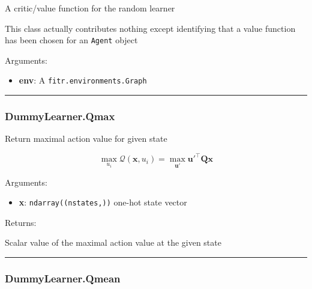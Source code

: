 A critic/value function for the random learner

This class actually contributes nothing except identifying that a value
function has been chosen for an \texttt{Agent} object

Arguments:

\begin{itemize}
\tightlist
\item
  \textbf{env}: A \texttt{fitr.environments.Graph}
\end{itemize}

\begin{center}\rule{0.5\linewidth}{\linethickness}\end{center}

\hypertarget{dummylearner.qmax}{%
\subsubsection{DummyLearner.Qmax}\label{dummylearner.qmax}}

\begin{Shaded}
\begin{Highlighting}[]
\end{Highlighting}
\end{Shaded}

Return maximal action value for given state

\[
\max_{u_i}\mathcal Q(\mathbf x, u_i) = \max_{\mathbf u'} \mathbf u'^\top \mathbf Q \mathbf x
\]

Arguments:

\begin{itemize}
\tightlist
\item
  \textbf{x}: \texttt{ndarray((nstates,))} one-hot state vector
\end{itemize}

Returns:

Scalar value of the maximal action value at the given state

\begin{center}\rule{0.5\linewidth}{\linethickness}\end{center}

\hypertarget{dummylearner.qmean}{%
\subsubsection{DummyLearner.Qmean}\label{dummylearner.qmean}}

\begin{Shaded}
\begin{Highlighting}[]
\end{Highlighting}
\end{Shaded}

